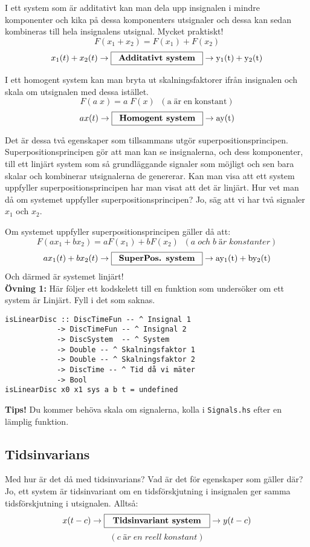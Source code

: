 \documentclass{article}
\begin{document}
I ett system som är additativt kan man dela upp insignalen i mindre
komponenter och kika på dessa komponenters utsignaler och dessa kan sedan
kombineras till hela insignalens utsignal. Mycket praktiskt!
$$F(x_{1}+x_{2}) = F(x_{1}) + F(x_{2})$$
$$x_{1}(t) + x_{2}(t) \rightarrow \framebox[1.2\width]{\textbf{Additativt system}} \rightarrow \mathrm{y_{1}(t) + y_{2}(t)}$$

I ett homogent system kan man bryta ut skalningsfaktorer ifrån insignalen och skala om utsignalen med dessa istället.
$$F(a \; x) = a\;F(x)\;\;\mathrm{(a\; är\; en\; konstant)} $$
$$a x(t) \rightarrow \framebox[1.2\width]{\textbf{Homogent system}} \rightarrow \mathrm{a y(t)}$$

Det är dessa två egenskaper som tillsammans utgör superpositionsprincipen.
Superpositionsprincipen gör att man kan se insignalerna, och dess
komponenter, till ett linjärt system som så grundläggande signaler som
möjligt och sen bara skalar och kombinerar utsignalerna de genererar.
Kan man visa att
ett system uppfyller superpositionsprincipen har man visat att det är
linjärt. 
Hur vet man då om systemet uppfyller superpositionsprincipen? Jo, säg att vi har två signaler $x_1$ och $x_2$.

Om systemet uppfyller superpositionsprincipen gäller då att: 
$$F(a x_{1}+b x_{2}) = a F(x_{1}) + b F(x_{2})
\;\;(a\; och\; b\; är\; konstanter) $$
$$a x_{1}(t)+b x_{2}(t) \rightarrow \framebox[1.2\width]{\textbf{SuperPos. system}} \rightarrow \mathrm{a y_{1}(t)+b y_{2}(t)}
$$
Och därmed är systemet linjärt!\\

\textbf{Övning 1:} Här följer ett kodskelett till en funktion som undersöker om ett
system är Linjärt. Fyll i det som saknas.
\begin{verbatim}
isLinearDisc :: DiscTimeFun -- ^ Insignal 1
            -> DiscTimeFun -- ^ Insignal 2
            -> DiscSystem  -- ^ System
            -> Double -- ^ Skalningsfaktor 1
            -> Double -- ^ Skalningsfaktor 2
            -> DiscTime -- ^ Tid då vi mäter
            -> Bool
isLinearDisc x0 x1 sys a b t = undefined
\end{verbatim}

\textbf{Tips!} Du kommer behöva skala om signalerna, kolla i {\tt Signals.hs} efter en
lämplig funktion.

\subsection{Tidsinvarians}
Med hur är det då med tidsinvarians? Vad är det för egenskaper som gäller
där? Jo, ett system är tidsinvariant om en tidsförskjutning i insignalen ger samma tidsförskjutning i utsignalen. Alltså:
$$x(t-c) \rightarrow \framebox[1.2\width]{\textbf{Tidsinvariant system}} \rightarrow y(t-c) $$
 $$(c\; är\; en\; reell\; konstant)$$
\end{document}
